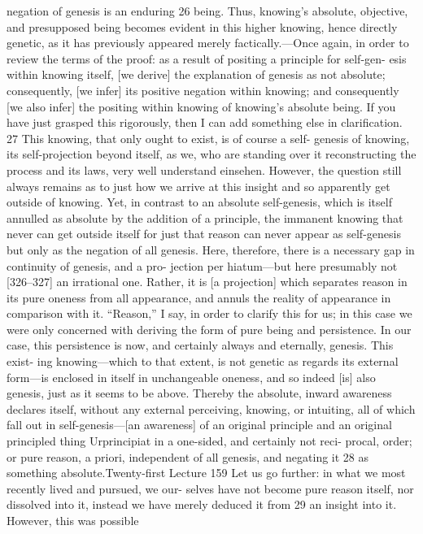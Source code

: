 negation of genesis is an enduring 26 being. Thus, knowing’s absolute, objective,
and presupposed being becomes evident in this higher knowing, hence directly
genetic, as it has previously appeared merely factically.—Once again, in order
to review the terms of the proof: as a result of positing a principle for self-gen-
esis within knowing itself, [we derive] the explanation of genesis as not
absolute; consequently, [we infer] its positive negation within knowing; and
consequently [we also infer] the positing within knowing of knowing’s
absolute being.
If you have just grasped this rigorously, then I can add something else
in clarification. 27 This knowing, that only ought to exist, is of course a self-
genesis of knowing, its self-projection beyond itself, as we, who are standing
over it reconstructing the process and its laws, very well understand {einsehen}.
However, the question still always remains as to just how we arrive at this
insight and so apparently get outside of knowing. Yet, in contrast to an
absolute self-genesis, which is itself annulled as absolute by the addition of a
principle, the immanent knowing that never can get outside itself for just that
reason can never appear as self-genesis but only as the negation of all genesis.
Here, therefore, there is a necessary gap in continuity of genesis, and a pro-
jection per hiatum—but here presumably not [326–327] an irrational one.
Rather, it is [a projection] which separates reason in its pure oneness from all
appearance, and annuls the reality of appearance in comparison with it.
“Reason,” I say, in order to clarify this for us; in this case we were only
concerned with deriving the form of pure being and persistence. In our case,
this persistence is now, and certainly always and eternally, genesis. This exist-
ing knowing—which to that extent, is not genetic as regards its external
form—is enclosed in itself in unchangeable oneness, and so indeed [is] also
genesis, just as it seems to be above. Thereby the absolute, inward awareness
declares itself, without any external perceiving, knowing, or intuiting, all of
which fall out in self-genesis—[an awareness] of an original principle and an
original principled thing {Urprincipiat} in a one-sided, and certainly not reci-
procal, order; or pure reason, a priori, independent of all genesis, and negating
it 28 as something absolute.Twenty-first Lecture
159
Let us go further: in what we most recently lived and pursued, we our-
selves have not become pure reason itself, nor dissolved into it, instead we
have merely deduced it from 29 an insight into it. However, this was possible
